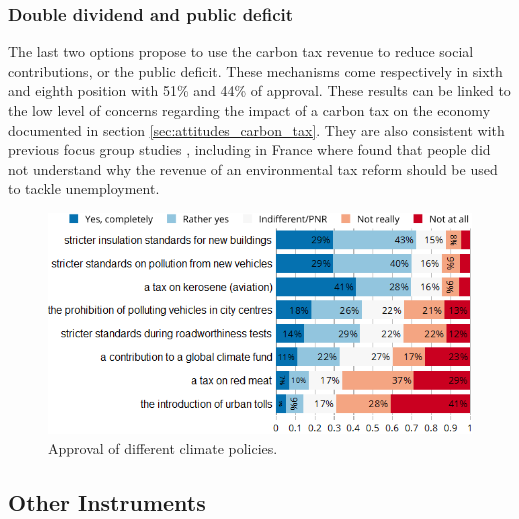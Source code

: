\documentclass[english,5p,authoryear]{elsarticle}
\begin{document}
        \subsubsection{Double dividend and public deficit}

The last two options propose to use the carbon tax revenue to reduce social contributions, or the public deficit. These mechanisms come respectively in sixth and eighth position with 51\% and 44\% of approval. These results can be linked to the low level of concerns regarding the impact of a carbon tax on the economy documented in section \ref{sec:attitudes_carbon_tax}. They are also consistent with previous focus group studies \citep[e.g.][]{kallbekken_aasen_2010}, including in France where \citet{deroubaix_rise_2006} found that people did not understand why the revenue of an environmental tax reform should be used to tackle unemployment.


\begin{figure}[t]
\centering
\includegraphics[width=\columnwidth]{Images/environmental_policies.png}
\caption{Approval of different climate policies.}
\label{fig:policies}
\end{figure}

    \subsection{Other Instruments}

\end{document}
